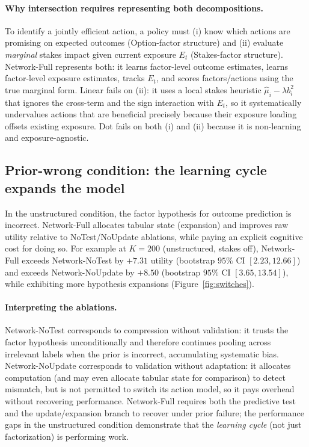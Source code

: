 \documentclass[11pt]{article}
\begin{document}
\paragraph{Why intersection requires representing both decompositions.}
To identify a jointly efficient action, a policy must (i) know which actions are promising on expected outcomes (Option-factor structure) and (ii) evaluate \emph{marginal} stakes impact given current exposure $E_t$ (Stakes-factor structure).
Network-Full represents both: it learns factor-level outcome estimates, learns factor-level exposure estimates, tracks $E_t$, and scores factors/actions using the true marginal form.
Linear fails on (ii): it uses a local stakes heuristic $\widehat{\mu}_i-\lambda b_i^2$ that ignores the cross-term and the sign interaction with $E_t$, so it systematically undervalues actions that are beneficial precisely because their exposure loading offsets existing exposure.
Dot fails on both (i) and (ii) because it is non-learning and exposure-agnostic.

\subsection{Prior-wrong condition: the learning cycle expands the model}

In the unstructured condition, the factor hypothesis for outcome prediction is incorrect. Network-Full allocates tabular state (expansion) and improves raw utility relative to NoTest/NoUpdate ablations, while paying an explicit cognitive cost for doing so. For example at $K=200$ (unstructured, stakes off), Network-Full exceeds Network-NoTest by $+7.31$ utility (bootstrap $95\%$ CI $[2.23,12.66]$) and exceeds Network-NoUpdate by $+8.50$ (bootstrap $95\%$ CI $[3.65,13.54]$), while exhibiting more hypothesis expansions (Figure~\ref{fig:switches}).

\paragraph{Interpreting the ablations.}
Network-NoTest corresponds to compression without validation: it trusts the factor hypothesis unconditionally and therefore continues pooling across irrelevant labels when the prior is incorrect, accumulating systematic bias.
Network-NoUpdate corresponds to validation without adaptation: it allocates computation (and may even allocate tabular state for comparison) to detect mismatch, but is not permitted to switch its action model, so it pays overhead without recovering performance.
Network-Full requires both the predictive test and the update/expansion branch to recover under prior failure; the performance gaps in the unstructured condition demonstrate that the \emph{learning cycle} (not just factorization) is performing work.
\end{document}
